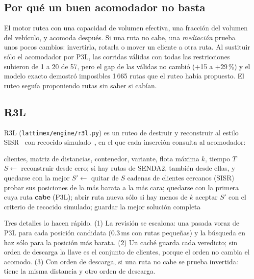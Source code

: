 \documentclass[11pt,a4paper]{article}
\newcommand{\sendados}{SENDA2}
\newcommand{\tsl}[1]{\texttt{\small #1}}
\begin{document}
\subsection{Por qué un buen acomodador no basta}

El motor rutea con una capacidad de volumen efectiva, una fracción del volumen del vehículo, y acomoda
después. Si una ruta no cabe, una \emph{mediación} prueba unos pocos cambios: invertirla, rotarla o
mover un cliente a otra ruta. Al sustituir sólo el acomodador por P3L, las corridas válidas con todas
las restricciones subieron de 1 a 20 de 57, pero el gap de las válidas no cambió (+15 a +29\,\%) y el
modelo exacto demostró imposibles 1\,665 rutas que el ruteo había propuesto. El ruteo seguía
proponiendo rutas sin saber si cabían.

\subsection{R3L}

R3L (\tsl{lattimex/engine/r3l.py}) es un ruteo de destruir y reconstruir al estilo
SISR~\cite{christiaens2020} con recocido simulado~\cite{kirkpatrick1983}, en el que cada inserción
consulta al acomodador:

\begin{algorithm}[H]
\caption{R3L (esquema)}
\begin{algorithmic}[1]
\Require clientes, matriz de distancias, contenedor, variante, flota máxima $k$, tiempo $T$
\State $S \gets$ reconstruir desde cero; si hay rutas de \sendados, también desde ellas, y quedarse con la mejor
  \State $S' \gets$ quitar de $S$ cadenas de clientes cercanos (SISR)
    \State probar sus posiciones de la más barata a la más cara;
    \State quedarse con la primera cuya ruta \textbf{cabe} (P3L); abrir ruta nueva sólo si hay menos de $k$
  \EndFor
  \State aceptar $S'$ con el criterio de recocido simulado; guardar la mejor solución completa
\EndWhile
\end{algorithmic}
\end{algorithm}

Tres detalles lo hacen rápido. (1) La revisión se escalona: una pasada voraz de P3L para cada posición
candidata (0.3\,ms con rutas pequeñas) y la búsqueda en haz sólo para la posición más barata. (2) Un
caché guarda cada veredicto; sin orden de descarga la llave es el conjunto de clientes, porque el orden
no cambia el acomodo. (3) Con orden de descarga, si una ruta no cabe se prueba invertida: tiene la
misma distancia y otro orden de descarga.
\end{document}
